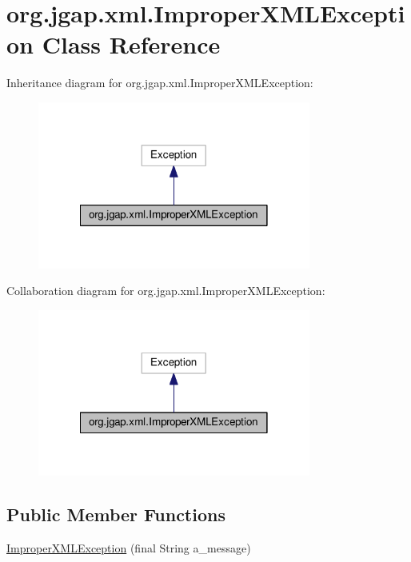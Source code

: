 \hypertarget{classorg_1_1jgap_1_1xml_1_1_improper_x_m_l_exception}{\section{org.\-jgap.\-xml.\-Improper\-X\-M\-L\-Exception Class Reference}
\label{classorg_1_1jgap_1_1xml_1_1_improper_x_m_l_exception}
}


Inheritance diagram for org.\-jgap.\-xml.\-Improper\-X\-M\-L\-Exception\-:
\nopagebreak
\begin{figure}[H]
\begin{center}
\leavevmode
\includegraphics[width=254pt]{classorg_1_1jgap_1_1xml_1_1_improper_x_m_l_exception__inherit__graph}
\end{center}
\end{figure}


Collaboration diagram for org.\-jgap.\-xml.\-Improper\-X\-M\-L\-Exception\-:
\nopagebreak
\begin{figure}[H]
\begin{center}
\leavevmode
\includegraphics[width=254pt]{classorg_1_1jgap_1_1xml_1_1_improper_x_m_l_exception__coll__graph}
\end{center}
\end{figure}
\subsection*{Public Member Functions}
\begin{DoxyCompactItemize}
\item 
\hyperlink{classorg_1_1jgap_1_1xml_1_1_improper_x_m_l_exception_a6e92c7dfc214dcd918e4bbb66dbd17f1}{Improper\-X\-M\-L\-Exception} (final String a\-\_\-message)
\end{DoxyCompactItemize}
